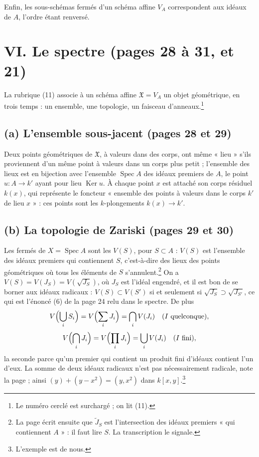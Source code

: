 \documentclass[11pt,a4paper]{article}
\begin{document}
Enfin, les sous-schémas fermés d'un schéma affine $V_A$ correspondent aux idéaux
de $A$, l'ordre étant renversé.

\section*{VI. Le spectre (pages 28 à 31, et 21)}

La rubrique (11) associe à un schéma affine $\mathfrak{X} = V_A$ un objet
géométrique, en trois temps : un ensemble, une topologie, un faisceau
d'anneaux.\footnote{Le numéro cerclé est surchargé ; on lit (11).}

\subsection*{(a) L'ensemble sous-jacent (pages 28 et 29)}

Deux points géométriques de $\mathfrak{X}$, à valeurs dans des corps, ont même
« lieu » s'ils proviennent d'un même point à valeurs dans un corps plus petit ;
l'ensemble des lieux est en bijection avec l'ensemble
$\operatorname{Spec} A$ des idéaux premiers de $A$, le point
$u : A \to k'$ ayant pour lieu $\operatorname{Ker} u$. À chaque point $x$ est
attaché son corps résiduel $k(x)$, qui représente le foncteur « ensemble des
points à valeurs dans le corps $k'$ de lieu $x$ » :
ces points sont les $k$-plongements $k(x) \to k'$.

\subsection*{(b) La topologie de Zariski (pages 29 et 30)}

Les fermés de $X = \operatorname{Spec} A$ sont les $V(S)$, pour $S \subset A$ :
$V(S)$ est l'ensemble des idéaux premiers qui contiennent $S$, c'est-à-dire des
lieux des points géométriques où tous les éléments de $S$
s'annulent.\footnote{La page écrit ensuite que $\widetilde{J}_S$ est
l'intersection des idéaux premiers « qui contiennent $A$ » : il faut lire
$S$. La transcription le signale.} On a
$V(S) = V(J_S) = V(\sqrt{J_S})$, où $J_S$ est l'idéal engendré, et il est bon de
se borner aux idéaux radicaux : $V(S) \subset V(S')$ si et seulement si
$\sqrt{J_S} \supset \sqrt{J_{S'}}$, ce qui est l'énoncé (6) de la page 24
relu dans le spectre. De plus
\[
V\Bigl(\bigcup_i S_i\Bigr) = V\Bigl(\sum_i J_i\Bigr) = \bigcap_i V(J_i) \quad (I \text{ quelconque}),
\]
\[
V\Bigl(\bigcap_i J_i\Bigr) = V\Bigl(\prod_i J_i\Bigr) = \bigcup_i V(J_i) \quad (I \text{ fini}),
\]
la seconde parce qu'un premier qui contient un produit fini d'idéaux contient
l'un d'eux. La somme de deux idéaux radicaux n'est pas nécessairement radicale,
note la page ; ainsi $(y) + (y - x^2) = (y, x^2)$ dans $k[x, y]$.\footnote{L'exemple
est de nous.}
\end{document}
